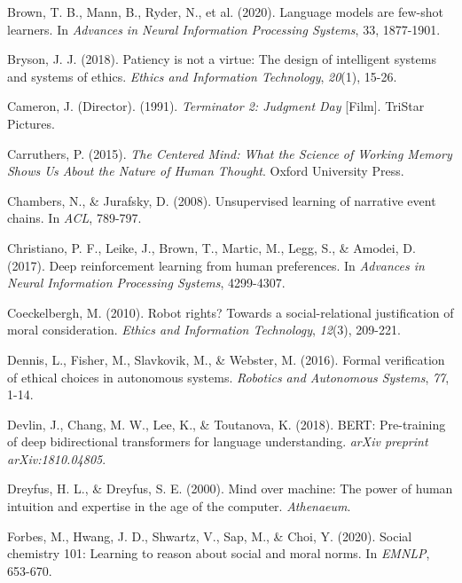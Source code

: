 \documentclass[12pt]{article}
\begin{document}
\begin{thebibliography}{99}
Brown, T. B., Mann, B., Ryder, N., et al. (2020). Language models are few-shot learners. In \textit{Advances in Neural Information Processing Systems}, 33, 1877-1901.

Bryson, J. J. (2018). Patiency is not a virtue: The design of intelligent systems and systems of ethics. \textit{Ethics and Information Technology}, \textit{20}(1), 15-26.

Cameron, J. (Director). (1991). \textit{Terminator 2: Judgment Day} [Film]. TriStar Pictures.

Carruthers, P. (2015). \textit{The Centered Mind: What the Science of Working Memory Shows Us About the Nature of Human Thought}. Oxford University Press.

Chambers, N., \& Jurafsky, D. (2008). Unsupervised learning of narrative event chains. In \textit{ACL}, 789-797.

Christiano, P. F., Leike, J., Brown, T., Martic, M., Legg, S., \& Amodei, D. (2017). Deep reinforcement learning from human preferences. In \textit{Advances in Neural Information Processing Systems}, 4299-4307.

Coeckelbergh, M. (2010). Robot rights? Towards a social-relational justification of moral consideration. \textit{Ethics and Information Technology}, \textit{12}(3), 209-221.

Dennis, L., Fisher, M., Slavkovik, M., \& Webster, M. (2016). Formal verification of ethical choices in autonomous systems. \textit{Robotics and Autonomous Systems}, \textit{77}, 1-14.

Devlin, J., Chang, M. W., Lee, K., \& Toutanova, K. (2018). BERT: Pre-training of deep bidirectional transformers for language understanding. \textit{arXiv preprint arXiv:1810.04805}.

Dreyfus, H. L., \& Dreyfus, S. E. (2000). Mind over machine: The power of human intuition and expertise in the age of the computer. \textit{Athenaeum}.

Forbes, M., Hwang, J. D., Shwartz, V., Sap, M., \& Choi, Y. (2020). Social chemistry 101: Learning to reason about social and moral norms. In \textit{EMNLP}, 653-670.


\end{thebibliography}
\end{document}
